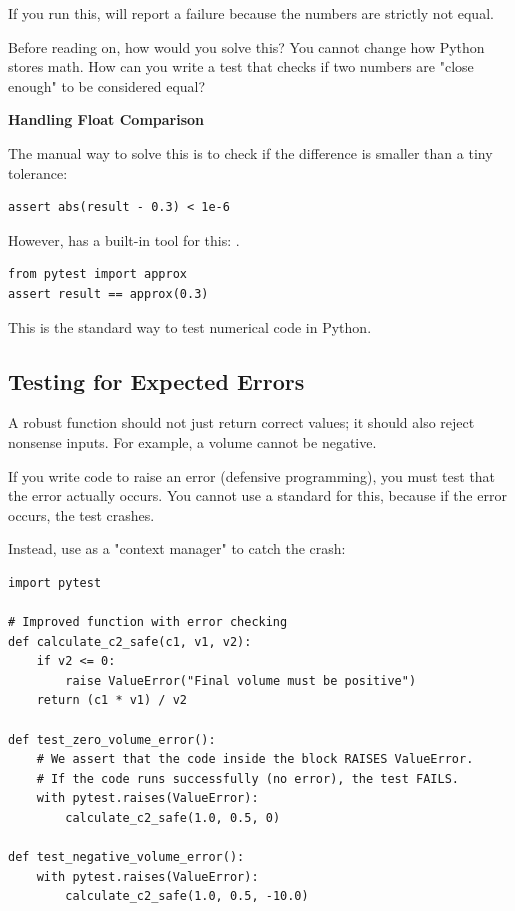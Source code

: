 If you run this,  will report a failure because the numbers are strictly not equal.

\begin{ponder}
Before reading on, how would you solve this? You cannot change how Python stores math. How can you write a test that checks if two numbers are "close enough" to be considered equal?
\end{ponder}

\begin{tip}
\textbf{Handling Float Comparison}

The manual way to solve this is to check if the difference is smaller than a tiny tolerance:
\begin{lstlisting}
assert abs(result - 0.3) < 1e-6
\end{lstlisting}

However,  has a built-in tool for this: .
\begin{lstlisting}
from pytest import approx
assert result == approx(0.3)
\end{lstlisting}
This is the standard way to test numerical code in Python.
\end{tip}

\subsection{Testing for Expected Errors}

A robust function should not just return correct values; it should also reject nonsense inputs. For example, a volume cannot be negative.

If you write code to raise an error (defensive programming), you must test that the error actually occurs. You cannot use a standard  for this, because if the error occurs, the test crashes.

Instead, use  as a "context manager" to catch the crash:

\begin{lstlisting}
import pytest

# Improved function with error checking
def calculate_c2_safe(c1, v1, v2):
    if v2 <= 0:
        raise ValueError("Final volume must be positive")
    return (c1 * v1) / v2

def test_zero_volume_error():
    # We assert that the code inside the block RAISES ValueError.
    # If the code runs successfully (no error), the test FAILS.
    with pytest.raises(ValueError):
        calculate_c2_safe(1.0, 0.5, 0)

def test_negative_volume_error():
    with pytest.raises(ValueError):
        calculate_c2_safe(1.0, 0.5, -10.0)
\end{lstlisting}

